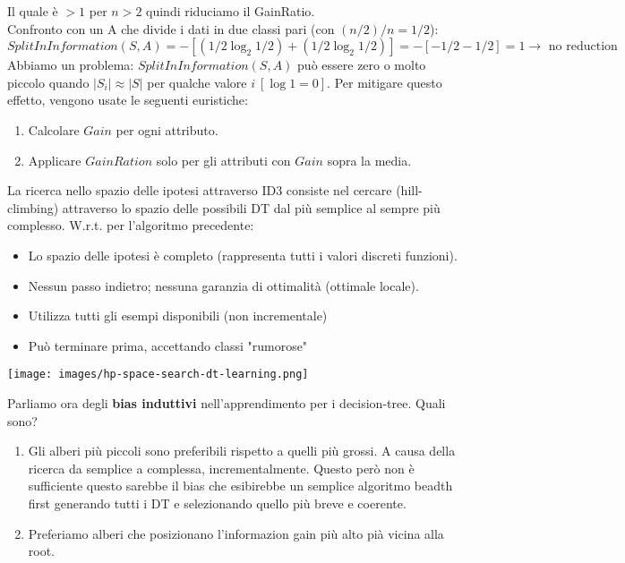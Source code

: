 Il quale è $> 1$ per $n > 2$ quindi riduciamo il GainRatio.\\
Confronto con un A che divide i dati in due classi pari (con $(n/2)/n = 1/2$):
$$SplitInInformation(S, A) = -[(1/2 \log_2 1/2) + (1/2\log_2 1/2)] = -[-1/2 - 1/2] = 1 \to \text{ no reduction }$$
Abbiamo un problema: $SplitInInformation(S, A)$ può essere zero o molto piccolo quando $|S_i|\approx |S|$ per qualche valore $i \: [\log 1 = 0]$.
Per mitigare questo effetto, vengono usate le seguenti euristiche:
\begin{enumerate}
    \item Calcolare $Gain$ per ogni attributo.
    \item Applicare $GainRation$ solo per gli attributi con $Gain$ sopra la media.
\end{enumerate} 
La ricerca nello spazio delle ipotesi attraverso ID3 consiste nel cercare (hill-climbing) attraverso lo spazio delle possibili
DT dal più semplice al sempre più complesso. W.r.t. per l'algoritmo precedente:
\begin{minipage}{.6\linewidth}
    \begin{itemize}
        \item Lo spazio delle ipotesi è completo (rappresenta tutti i valori discreti funzioni).
        \item Nessun passo indietro; nessuna garanzia di ottimalità (ottimale locale).
        \item Utilizza tutti gli esempi disponibili (non incrementale)
        \item Può terminare prima, accettando classi "rumorose"
    \end{itemize}
\end{minipage}
\hfill
\begin{minipage}{.4\linewidth}
    \centering
    \texttt{[image: images/hp-space-search-dt-learning.png]}
\end{minipage}
Parliamo ora degli \textbf{bias induttivi} nell'apprendimento per i decision-tree. Quali sono?
\begin{enumerate}
    \item Gli alberi più piccoli sono preferibili rispetto a quelli più grossi. A causa della ricerca da semplice a complessa, incrementalmente.
    Questo però non è sufficiente questo sarebbe il bias che esibirebbe un semplice algoritmo beadth first generando tutti i DT e selezionando quello più breve e coerente.
    \item Preferiamo alberi che posizionano l'informazion gain più alto pià vicina alla root.
\end{enumerate}
